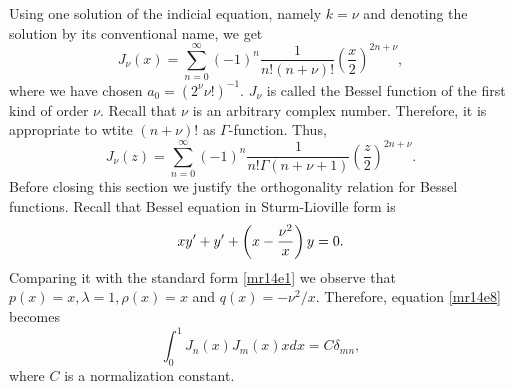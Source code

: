 Using one solution of the indicial equation, namely $k = \nu$ and denoting the solution by its conventional name, we get
\begin{equation}\label{mr15e6}
J_\nu(x) = \sum_{n=0}^\infty (-1)^n\frac{1}{n!(n+\nu)!}\left(\frac{x}{2}\right)^{2n+\nu},
\end{equation}
where we have chosen $a_0 = (2^\nu \nu!)^{-1}$. $J_\nu$ is called the Bessel function of the first kind of order $\nu$. Recall that $\nu$ is an arbitrary complex number. 
Therefore, it is appropriate to wtite $(n + \nu)!$ as $\Gamma$-function. Thus,
\begin{equation}\label{mr15e7}
J_\nu(z) = \sum_{n=0}^\infty (-1)^n\frac{1}{n!\Gamma(n+\nu+1)}\left(\frac{z}{2}\right)^{2n+\nu}.
\end{equation}
Before closing this section we justify the orthogonality relation for Bessel functions. Recall that Bessel equation in Sturm-Lioville form is
\[
xy^\prime + y^\prime + \left(x - \frac{\nu^2}{x}\right)y  = 0.
\]
Comparing it with the standard form \eqref{mr14e1} we observe that $p(x) = x, \lambda = 1, \rho(x) = x$ and $q(x) = -\nu^2/x$. Therefore, equation \eqref{mr14e8} becomes
\begin{equation}\label{mr15e8}
\int_0^1 J_n(x)J_m(x)xdx = C\delta_{mn},
\end{equation}
where $C$ is a normalization constant.

